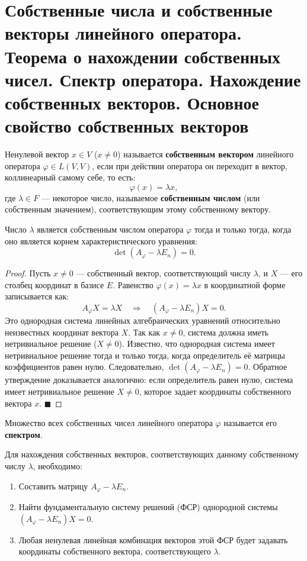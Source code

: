 \section{Собственные числа и собственные векторы линейного оператора. Теорема о нахождении собственных чисел. Спектр оператора. Нахождение собственных векторов. Основное свойство собственных векторов}

\begin{definition}
Ненулевой вектор $x \in V$ ($x \neq 0$) называется \textbf{собственным вектором} линейного оператора $\varphi \in L(V, V)$, если при действии оператора он переходит в вектор, коллинеарный самому себе, то есть:
\[
\varphi(x) = \lambda x,
\]
где $\lambda \in F$ --- некоторое число, называемое \textbf{собственным числом} (или собственным значением), соответствующим этому собственному вектору.
\end{definition}

\begin{theorem}
Число $\lambda$ является собственным числом оператора $\varphi$ тогда и только тогда, когда оно является корнем характеристического уравнения:
\[
\det(A_\varphi - \lambda E_n) = 0.
\]
\end{theorem}

\begin{proof}
Пусть $x \neq 0$ --- собственный вектор, соответствующий числу $\lambda$, и $X$ --- его столбец координат в базисе $E$. Равенство $\varphi(x) = \lambda x$ в координатной форме записывается как:
\[
A_\varphi X = \lambda X \quad \Rightarrow \quad (A_\varphi - \lambda E_n) X = 0.
\]
Это однородная система линейных алгебраических уравнений относительно неизвестных координат вектора $X$. Так как $x \neq 0$, система должна иметь нетривиальное решение ($X \neq 0$). Известно, что однородная система имеет нетривиальное решение тогда и только тогда, когда определитель её матрицы коэффициентов равен нулю. Следовательно, $\det(A_\varphi - \lambda E_n) = 0$.
Обратное утверждение доказывается аналогично: если определитель равен нулю, система имеет нетривиальное решение $X \neq 0$, которое задает координаты собственного вектора $x$.
\hfill$\blacksquare$
\end{proof}

\begin{definition}
Множество всех собственных чисел линейного оператора $\varphi$ называется его \textbf{спектром}.
\end{definition}

\begin{remark}
Для нахождения собственных векторов, соответствующих данному собственному числу $\lambda$, необходимо:
\begin{enumerate}
    \item Составить матрицу $A_\varphi - \lambda E_n$.
    \item Найти фундаментальную систему решений (ФСР) однородной системы $(A_\varphi - \lambda E_n)X = 0$.
    \item Любая ненулевая линейная комбинация векторов этой ФСР будет задавать координаты собственного вектора, соответствующего $\lambda$.
\end{enumerate}
\end{remark}

